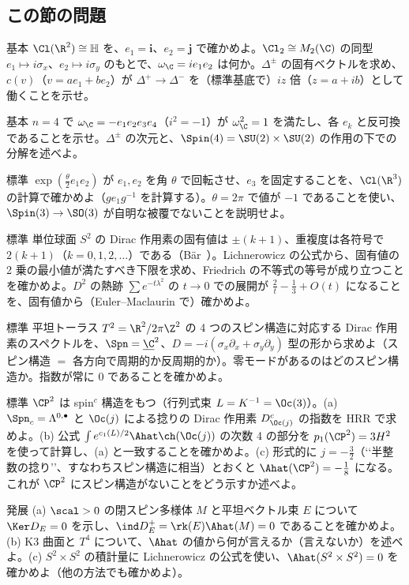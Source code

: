 \subsection*{この節の問題}
\begin{prob}{基本}\label{p:cl2}
$\Cl(\R^2)\cong\mathbb H$ を、$e_1=\mathbf i$、$e_2=\mathbf j$ で確かめよ。$\Cl_2\cong M_2(\C)$ の同型 $e_1\mapsto i\sigma_x$、$e_2\mapsto i\sigma_y$ のもとで、$\omega_{\C}=ie_1e_2$ は何か。$\Delta^\pm$ の固有ベクトルを求め、$c(v)$（$v=ae_1+be_2$）が $\Delta^+\to\Delta^-$ を（標準基底で）$iz$ 倍（$z=a+ib$）として働くことを示せ。
\end{prob}
\begin{prob}{基本}\label{p:chir}
$n=4$ で $\omega_{\C}=-e_1e_2e_3e_4$（$i^2=-1$）が $\omega_{\C}^2=1$ を満たし、各 $e_k$ と反可換であることを示せ。$\Delta^\pm$ の次元と、$\Spin(4)=\SU(2)\times\SU(2)$ の作用の下での分解を述べよ。
\end{prob}
\begin{prob}{標準}\label{p:spin2}
$\exp(\frac\theta2e_1e_2)$ が $e_1,e_2$ を角 $\theta$ で回転させ、$e_3$ を固定することを、$\Cl(\R^3)$ の計算で確かめよ（$ge_1g^{-1}$ を計算する）。$\theta=2\pi$ で値が $-1$ であることを使い、$\Spin(3)\to\SO(3)$ が自明な被覆でないことを説明せよ。
\end{prob}
\begin{prob}{標準}\label{p:lichS2}
単位球面 $S^2$ の Dirac 作用素の固有値は $\pm(k+1)$、重複度は各符号で $2(k+1)$（$k=0,1,2,\ldots$）である（Bär\tC\ ）。Lichnerowicz の公式から、固有値の 2 乗の最小値が満たすべき下限を求め、Friedrich の不等式の等号が成り立つことを確かめよ。$D^2$ の熱跡 $\sum e^{-t\lambda^2}$ の $t\to0$ での展開が $\frac2t-\frac13+O(t)$ になることを、固有値から（Euler--Maclaurin で）確かめよ。
\end{prob}
\begin{prob}{標準}\label{p:T2spin}
平坦トーラス $T^2=\R^2/2\pi\Z^2$ の 4 つのスピン構造に対応する Dirac 作用素のスペクトルを、$\Spn=\underline{\C}^2$、$D=-i(\sigma_x\partial_x+\sigma_y\partial_y)$ 型の形から求めよ（スピン構造 $=$ 各方向で周期的か反周期的か）。零モードがあるのはどのスピン構造か。指数が常に $0$ であることを確かめよ。
\end{prob}
\begin{prob}{標準}\label{p:spinc}
$\CP^2$ は spin$^c$ 構造をもつ（行列式束 $L=K^{-1}=\Oc(3)$）。(a) $\Spn_c=\Lambda^{0,\bullet}$ と $\Oc(j)$ による捻りの Dirac 作用素 $D^c_{\Oc(j)}$ の指数を HRR で求めよ。(b) 公式 $\int e^{c_1(L)/2}\Ahat\ch(\Oc(j))$ の次数 4 の部分を $p_1(\CP^2)=3H^2$ を使って計算し、(a) と一致することを確かめよ。(c) 形式的に $j=-\frac32$（\lq\lq 半整数の捻り\rq\rq、すなわちスピン構造に相当）とおくと $\Ahat(\CP^2)=-\frac18$ になる。これが $\CP^2$ にスピン構造がないことをどう示すか述べよ。
\end{prob}
\begin{prob}{発展}\label{p:psc}
(a) $\scal>0$ の閉スピン多様体 $M$ と平坦ベクトル束 $E$ について $\Ker D_E=0$ を示し、$\ind D_E^+=\rk(E)\Ahat(M)=0$ であることを確かめよ。(b) K3 曲面と $T^4$ について、$\Ahat$ の値から何が言えるか（言えないか）を述べよ。(c) $S^2\times S^2$ の積計量に Lichnerowicz の公式を使い、$\Ahat(S^2\times S^2)=0$ を確かめよ（他の方法でも確かめよ）。
\end{prob}
